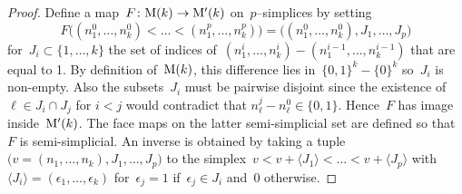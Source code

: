 \begin{proof}
Define a map~$F\colon\mathrm{M}(k)\to \mathrm{M}'(k)$ on~$p$--simplices by setting 
$$F\big((n_1^0,\dots,n^0_{k})<\dots <  (n^p_1,\dots,n^p_{k})\big)=\big((n_1^0,\dots,n^0_{k}),J_1,\dots,J_p\big)$$
for~$J_i\subset \{1,\dots,k\}$ the set of indices of~$(n_1^{i},\dots,n^{i}_{k})- (n_1^{i-1},\dots,n^{i-1}_{k})$ that are equal to 1. By definition of~$\mathrm{M}(k)$, this difference lies in~$\{0,1\}^k\minus \{0\}^k$ so~$J_i$ is non-empty.
Also the subsets~$J_i$ must be pairwise disjoint since the existence of $\ell\in J_i\cap J_j$ for $i<j$ would contradict that $n_\ell^j-n_\ell^0\in\{0,1\}$. 
Hence~$F$ has image inside~$\mathrm{M}'(k)$. The face maps on the latter semi-simplicial set are defined so that~$F$ is semi-simplicial. An inverse is obtained by taking 
a tuple~$\big(v=(n_1,\dots,n_{k}),J_1,\dots,J_p\big)$ to the simplex~$v<v+\langle J_1\rangle<\dots<v+\langle J_p\rangle$ with~$\langle J_i\rangle=(\epsilon_1,\dots,\epsilon_k)$ for~$\epsilon_j=1$ if~$\epsilon_j\in J_i$ and~$0$ otherwise. 
\end{proof}

